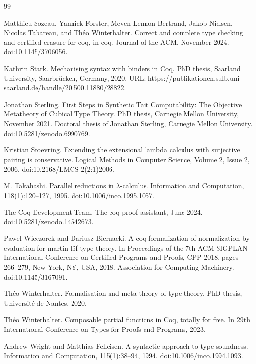 \documentclass[10pt,a4paper]{amsart}
\begin{document}
\begin{thebibliography}{99}
\par\noindent  [45]  Matthieu Sozeau, Yannick Forster, Meven Lennon-Bertrand, Jakob Nielsen, Nicolas Tabareau, and Théo Winterhalter.  Correct and complete type checking and certified erasure for coq, in coq.  Journal of the ACM, November 2024.  doi:10.1145/3706056.  
 
\par\noindent  [46]  Kathrin Stark.  Mechanising syntax with binders in Coq.  PhD thesis, Saarland University, Saarbrücken, Germany, 2020.  URL: https://publikationen.sulb.uni-saarland.de/handle/20.500.11880/28822.  
 
\par\noindent  [47]  Jonathan Sterling.  First Steps in Synthetic Tait Computability: The Objective Metatheory of Cubical Type Theory.  PhD thesis, Carnegie Mellon University, November 2021.  Doctoral thesis of Jonathan Sterling, Carnegie Mellon University.  doi:10.5281/zenodo.6990769.  
 
\par\noindent  [48]  Kristian Stoevring.  Extending the extensional lambda calculus with surjective pairing is conservative.  Logical Methods in Computer Science, Volume 2, Issue 2, 2006.  doi:10.2168/LMCS-2(2:1)2006.  
 
\par\noindent  [49]  M. Takahashi.  Parallel reductions in $\lambda$-calculus.  Information and Computation, 118(1):120–127, 1995.  doi:10.1006/inco.1995.1057.  
 
\par\noindent  [50]  The Coq Development Team.  The coq proof assistant, June 2024.  doi:10.5281/zenodo.14542673.  
 
\par\noindent  [51]  Pawel Wieczorek and Dariusz Biernacki.  A coq formalization of normalization by evaluation for martin-löf type theory.  In Proceedings of the 7th ACM SIGPLAN International Conference on Certified Programs and Proofs, CPP 2018, pages 266–279, New York, NY, USA, 2018. Association for Computing Machinery.  doi:10.1145/3167091.  
 
\par\noindent  [52]  Théo Winterhalter.  Formalisation and meta-theory of type theory.  PhD thesis, Université de Nantes, 2020.  
 
\par\noindent  [53]  Théo Winterhalter.  Composable partial functions in Coq, totally for free.  In 29th International Conference on Types for Proofs and Programs, 2023.  
 
\par\noindent  [54]  Andrew Wright and Matthias Felleisen.  A syntactic approach to type soundness.  Information and Computation, 115(1):38–94, 1994.  doi:10.1006/inco.1994.1093.  
  
\end{thebibliography}
\end{document}

